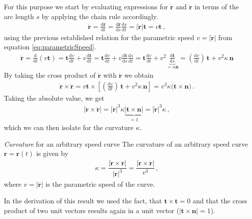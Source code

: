 \documentclass[11pt, DINA4, fleqn]{amsart}
\def\df{\mathrm{d}\xspace}
\newcommand{\dd}[2]{\frac{\df#1}{\df#2}}
\def\vr{\boldsymbol{r}\xspace}
\def\vrd{\dot{\vr}\xspace}
\def\vrdd{\ddot{\vr}\xspace}
\def\vt{\boldsymbol{t}\xspace}
\def\vn{\boldsymbol{n}\xspace}
\begin{document}
For this purpose we start by evaluating expressions for $\vrd$ and $\vrdd$ in terms of the arc length $s$ by applying the chain rule accordingly.
\begin{align}
\vrd = \dd{\vr}{t} = \dd{\vr}{s} \dd{s}{t} = |\vrd| \vt = v \vt \, ,
\end{align}
using the previous established relation for the parametric speed $v = |\vrd|$ from equation \eqref{eq:parametricSpeed}.
\begin{align}
\vrdd = \dd{}{t}\left(v\vt\right) = \vt \dd{v}{t} + v\dd{\vt}{t} = \vt \dd{v}{t} + v \dd{\vt}{s}\dd{s}{t}
= \vt \dd{v}{t} + v^2 \underbrace{\dd{\vt}{s}}_{=\kappa \vn} = \left(\dd{v}{t}\right) \, \vt + v^2\kappa \, \vn
\end{align}
By taking the cross product of $\vrd$ with $\vrdd$ we obtain
\begin{align}
\vrd \times \vrdd = v\vt \times \left[
\left(\dd{v}{t}\right) \, \vt + v^2\kappa \, \vn
\right]
= v^3\kappa \biggl(\vt \times \vn \biggl) \, .
\label{eq:curvatureDerivation2}
\end{align}
Taking the absolute value, we get
\begin{align}
\left|\vrd\times\vrdd\right| = |\vrd|^3 \kappa \underbrace{|\vt \times\vn|}_{= 1} = |\vrd|^3 \kappa \, ,
\label{eq:curvatureDerivation3}
\end{align}
which we can then isolate for the curvature $\kappa$.
\begin{mybox_tc3}{\emph{Curvature} for an arbitrary speed curve}
	The curvature of an arbitrary speed curve $\vr = \vr(t)$ is
	given by
	\begin{align}
	\kappa = \dfrac{|\vrd\times\vrdd|}{|\vrd|^3} = \dfrac{|\vrd\times\vrdd|}{v^3} \, ,
	\end{align}
	where $v = |\vrd|$ is the parametric speed of the curve.
\end{mybox_tc3}
In the derivation of this result we used the fact, that $\vt \times \vt = 0$ and that the cross product of two unit vectors results again in a unit vector ($|\vt\times\vn| = 1$).
\end{document}
